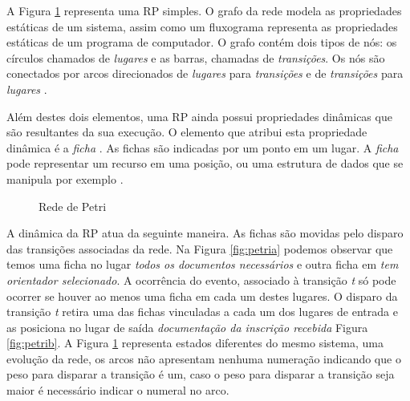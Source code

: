 A Figura \ref{fig:rede_petri} representa uma RP simples. O grafo da rede modela as propriedades estáticas de um sistema, assim como um fluxograma representa as propriedades estáticas de um programa de computador. O grafo contém dois tipos de nós: os círculos chamados de \textit{lugares} e as barras, chamadas de \textit{transições}. Os nós são conectados por arcos direcionados de \textit{lugares} para \textit{transições} e de \textit{transições} para \textit{lugares} \cite{peterson1977petri}. 

Além destes dois elementos, uma RP ainda possui propriedades dinâmicas que são resultantes da sua execução. O elemento que atribui esta propriedade dinâmica é a \textit{ficha} \cite{peterson1977petri}. As fichas são indicadas por um ponto em um lugar. A \textit{ficha} pode representar um recurso em uma posição, ou uma estrutura de dados que se manipula por exemplo \cite{cardoso1997redes}.

\begin{figure}[ht]
  \centering
  \caption{Rede de Petri}
  \label{fig:rede_petri}
\end{figure}

A dinâmica da RP atua da seguinte maneira.  As fichas são movidas pelo disparo das transições associadas da rede. Na Figura \ref{fig:petria} podemos observar que temos uma ficha no lugar \textit{todos os documentos necessários} e outra ficha em \textit{tem orientador selecionado}. A ocorrência do evento, associado à transição \textit{t} só pode ocorrer se houver ao menos uma ficha em cada um destes lugares. O disparo da transição \textit{t} retira uma das fichas vinculadas a cada um dos lugares de entrada e as posiciona no lugar de saída \textit{documentação da inscrição recebida} Figura \ref{fig:petrib}. A Figura \ref{fig:rede_petri} representa estados diferentes do mesmo sistema, uma evolução da rede, os arcos não apresentam nenhuma numeração indicando que o peso para disparar a transição é um, caso o peso para disparar a transição seja maior é necessário indicar o numeral no arco. 

